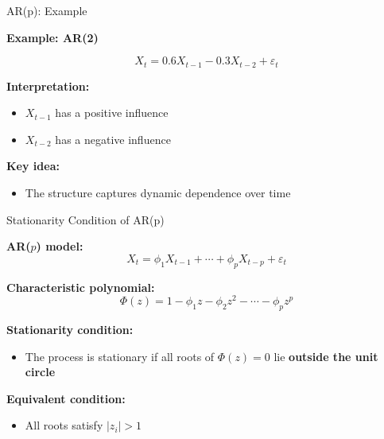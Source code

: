 \documentclass[aspectratio=169]{beamer}
\begin{document}
\begin{frame}{AR(p): Example}

\textbf{Example: AR(2)}

\[
X_t = 0.6 X_{t-1} - 0.3 X_{t-2} + \varepsilon_t
\]

\vspace{0.4cm}

\textbf{Interpretation:}
\begin{itemize}
    \item $X_{t-1}$ has a positive influence
    \item $X_{t-2}$ has a negative influence
\end{itemize}

\vspace{0.4cm}

\textbf{Key idea:}
\begin{itemize}
    \item The structure captures dynamic dependence over time
\end{itemize}

\end{frame}

\begin{frame}{Stationarity Condition of AR(p)}

\textbf{AR($p$) model:}
\[
X_t = \phi_1 X_{t-1} + \cdots + \phi_p X_{t-p} + \varepsilon_t
\]

\vspace{0.4cm}

\textbf{Characteristic polynomial:}
\[
\Phi(z) = 1 - \phi_1 z - \phi_2 z^2 - \cdots - \phi_p z^p
\]

\vspace{0.4cm}

\textbf{Stationarity condition:}
\begin{itemize}
    \item The process is stationary if all roots of $\Phi(z)=0$ lie \textbf{outside the unit circle}
\end{itemize}

\vspace{0.4cm}

\textbf{Equivalent condition:}
\begin{itemize}
    \item All roots satisfy $|z_i| > 1$
\end{itemize}

\end{frame}
\end{document}
